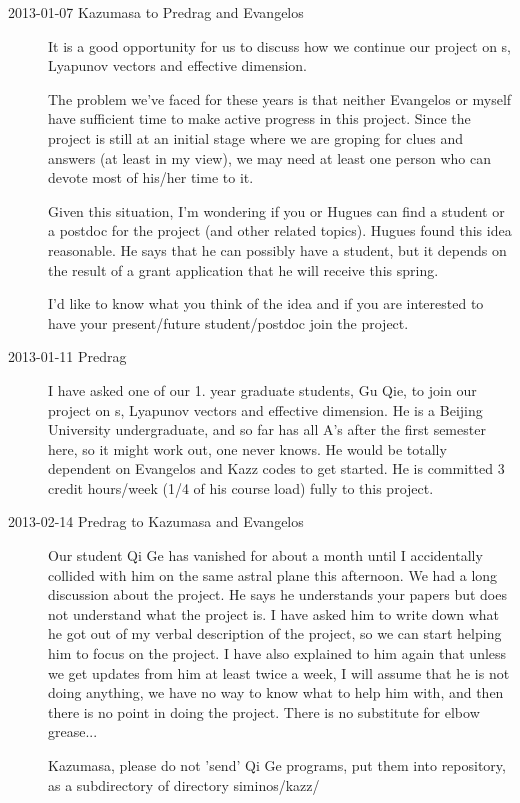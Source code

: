 \begin{description}
\item[2013-01-07 Kazumasa to Predrag and Evangelos]
It is a good opportunity for us to discuss how we continue our
project on \po s, Lyapunov vectors and effective dimension.

The problem we've faced for these years is that neither Evangelos or
myself have sufficient time to make active progress in this project.
Since the project is still at an initial stage where we are groping
for clues and answers (at least in my view), we may need at least one
person who can devote most of his/her time to it.

Given this situation, I'm wondering if you or Hugues can find a
student or a postdoc for the project (and other related topics).
Hugues found this idea reasonable. He says that he can possibly have
a student, but it depends on the result of a grant application that
he will receive this spring.

I'd like to know what you think of the idea and if you are interested
to have your present/future student/postdoc join the project.

\item[2013-01-11 Predrag]
I have asked one of our 1. year graduate students, Gu Qie, to join
our project on \po s, Lyapunov vectors and effective dimension. He is
a Beijing University undergraduate, and so far has all A's after the
first semester here, so it might work out, one never knows. He would
be totally dependent on Evangelos and Kazz codes to get started. He
is committed 3 credit hours/week (1/4 of his course load) fully to
this project.

\item[2013-02-14 Predrag to Kazumasa and Evangelos] Our student Qi Ge
has vanished for about a month until I accidentally collided with him
on the same astral plane this afternoon. We had a long discussion
about the project. He says he understands your papers but does not
understand what the project is. I have asked him to write down what
he got out of my verbal description of the project, so we can start
helping him to focus on the project. I have also explained to him
again that unless we get updates from him at least twice a week, I
will assume that he is not doing anything, we have no way to know
what to help him with, and then there is no point in doing the
project. There is no substitute for elbow grease...

Kazumasa, please do not 'send' Qi Ge programs, put them into
repository, as a subdirectory of directory siminos/kazz/


\end{description}
